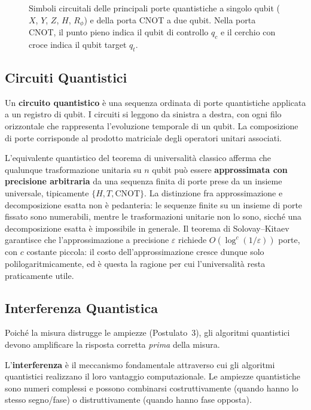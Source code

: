 \begin{onehalfspace}
\begin{figure}[H]
\caption[Porte quantistiche a singolo e due qubit]{Simboli circuitali delle principali porte quantistiche a singolo qubit ($X$, $Y$, $Z$, $H$, $R_\phi$) e della porta CNOT a due qubit. Nella porta CNOT, il punto pieno indica il qubit di controllo $q_c$ e il cerchio con croce indica il qubit target $q_t$.}\label{fig:gates}
\end{figure}
\clearpage
\subsection{Circuiti Quantistici}

Un \textbf{circuito quantistico} è una sequenza ordinata di porte quantistiche applicata a un registro di qubit. I circuiti si leggono da sinistra a destra, con ogni filo orizzontale che rappresenta l'evoluzione temporale di un qubit. La composizione di porte corrisponde al prodotto matriciale degli operatori unitari associati.

L'equivalente quantistico del teorema di universalità classico afferma che qualunque trasformazione unitaria su $n$ qubit può essere \textbf{approssimata con precisione arbitraria} da una sequenza finita di porte prese da un insieme universale, tipicamente $\{H, T, \text{CNOT}\}$. La distinzione fra approssimazione e decomposizione esatta non è pedanteria: le sequenze finite su un insieme di porte fissato sono numerabili, mentre le trasformazioni unitarie non lo sono, sicché una decomposizione esatta è impossibile in generale. Il teorema di Solovay--Kitaev garantisce che l'approssimazione a precisione $\varepsilon$ richiede $O(\log^c(1/\varepsilon))$ porte, con $c$ costante piccola: il costo dell'approssimazione cresce dunque solo polilogaritmicamente, ed è questa la ragione per cui l'universalità resta praticamente utile.

\subsection{Interferenza Quantistica}

Poiché la misura distrugge le ampiezze (Postulato~3), gli algoritmi quantistici devono amplificare la risposta corretta \emph{prima} della misura.

L'\textbf{interferenza} è il meccanismo fondamentale attraverso cui gli algoritmi quantistici realizzano il loro vantaggio computazionale. Le ampiezze quantistiche sono numeri complessi e possono combinarsi costruttivamente (quando hanno lo stesso segno/fase) o distruttivamente (quando hanno fase opposta).


\end{onehalfspace}

